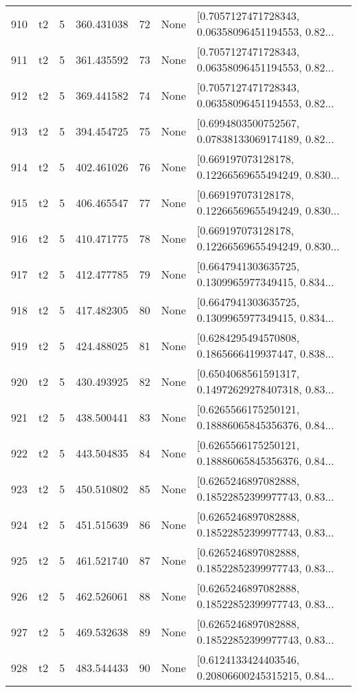\begin{tabular}{lllrlll}
910 &  t2 &   5 &   360.431038 &   72 &  None &  [0.7057127471728343, 0.06358096451194553, 0.82... \\
911 &  t2 &   5 &   361.435592 &   73 &  None &  [0.7057127471728343, 0.06358096451194553, 0.82... \\
912 &  t2 &   5 &   369.441582 &   74 &  None &  [0.7057127471728343, 0.06358096451194553, 0.82... \\
913 &  t2 &   5 &   394.454725 &   75 &  None &  [0.6994803500752567, 0.07838133069174189, 0.82... \\
914 &  t2 &   5 &   402.461026 &   76 &  None &  [0.669197073128178, 0.12266569655494249, 0.830... \\
915 &  t2 &   5 &   406.465547 &   77 &  None &  [0.669197073128178, 0.12266569655494249, 0.830... \\
916 &  t2 &   5 &   410.471775 &   78 &  None &  [0.669197073128178, 0.12266569655494249, 0.830... \\
917 &  t2 &   5 &   412.477785 &   79 &  None &  [0.6647941303635725, 0.1309965977349415, 0.834... \\
918 &  t2 &   5 &   417.482305 &   80 &  None &  [0.6647941303635725, 0.1309965977349415, 0.834... \\
919 &  t2 &   5 &   424.488025 &   81 &  None &  [0.6284295494570808, 0.1865666419937447, 0.838... \\
920 &  t2 &   5 &   430.493925 &   82 &  None &  [0.6504068561591317, 0.14972629278407318, 0.83... \\
921 &  t2 &   5 &   438.500441 &   83 &  None &  [0.6265566175250121, 0.18886065845356376, 0.84... \\
922 &  t2 &   5 &   443.504835 &   84 &  None &  [0.6265566175250121, 0.18886065845356376, 0.84... \\
923 &  t2 &   5 &   450.510802 &   85 &  None &  [0.6265246897082888, 0.18522852399977743, 0.83... \\
924 &  t2 &   5 &   451.515639 &   86 &  None &  [0.6265246897082888, 0.18522852399977743, 0.83... \\
925 &  t2 &   5 &   461.521740 &   87 &  None &  [0.6265246897082888, 0.18522852399977743, 0.83... \\
926 &  t2 &   5 &   462.526061 &   88 &  None &  [0.6265246897082888, 0.18522852399977743, 0.83... \\
927 &  t2 &   5 &   469.532638 &   89 &  None &  [0.6265246897082888, 0.18522852399977743, 0.83... \\
928 &  t2 &   5 &   483.544433 &   90 &  None &  [0.6124133424403546, 0.20806600245315215, 0.84... \\

\end{tabular}

